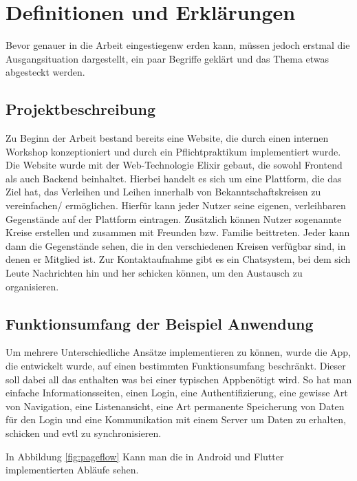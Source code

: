 \chapter{Definitionen und Erklärungen}

Bevor genauer in die Arbeit eingestiegenw erden kann, müssen jedoch erstmal die Ausgangsituation dargestellt, ein paar Begriffe geklärt und das Thema etwas abgesteckt werden.

\section{Projektbeschreibung}
Zu Beginn der Arbeit bestand bereits eine Website, die durch einen internen Workshop konzeptioniert und durch ein Pflichtpraktikum implementiert wurde. Die Website wurde mit der Web-Technologie Elixir gebaut, die sowohl Frontend als auch Backend beinhaltet. Hierbei handelt  es sich um eine Plattform, die das Ziel hat, das Verleihen und Leihen innerhalb von Bekanntschaftskreisen zu vereinfachen/ ermöglichen. Hierfür kann jeder Nutzer seine eigenen, verleihbaren Gegenstände auf der Plattform eintragen. Zusätzlich können Nutzer sogenannte Kreise erstellen und zusammen mit Freunden bzw. Familie beittreten. Jeder kann dann die Gegenstände sehen, die in den verschiedenen Kreisen verfügbar sind, in denen er Mitglied ist. Zur Kontaktaufnahme gibt es ein Chatsystem, bei dem sich Leute Nachrichten hin und her schicken können, um den Austausch zu organisieren.

\section{Funktionsumfang der Beispiel Anwendung}
Um mehrere Unterschiedliche Ansätze implementieren zu können, wurde die App, die entwickelt wurde, auf einen bestimmten Funktionsumfang beschränkt. Dieser soll dabei all das enthalten was bei einer typischen Appbenötigt wird. So hat man einfache Informationsseiten, einen Login, eine Authentifizierung, eine gewisse Art von Navigation, eine Listenansicht, eine Art permanente Speicherung von Daten für den Login und eine Kommunikation mit einem Server um Daten zu erhalten, schicken und evtl zu synchronisieren.

In Abbildung \ref{fig:pageflow} Kann man die in Android und Flutter implementierten Abläufe sehen.  

